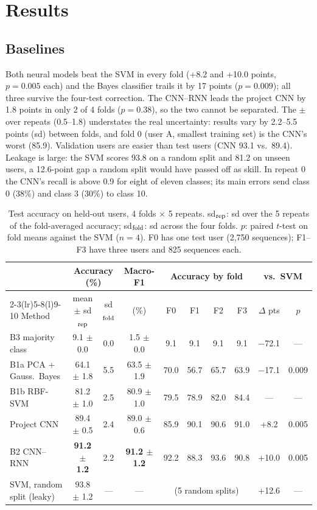 \documentclass[11pt]{article}
\begin{document}
\section{Results}\label{sec:res}
\subsection{Baselines}
Both neural models beat the SVM in every fold (+8.2 and +10.0 points, $p=0.005$ each) and the Bayes classifier trails it by 17 points ($p=0.009$); all three survive the four-test correction. The CNN--RNN leads the project CNN by 1.8 points in only 2 of 4 folds ($p=0.38$), so the two cannot be separated. The $\pm$ over repeats (0.5--1.8) understates the real uncertainty: results vary by 2.2--5.5 points (sd) between folds, and fold 0 (user A, smallest training set) is the CNN's worst (85.9). Validation users are easier than test users (CNN 93.1 vs.\ 89.4). Leakage is large: the SVM scores 93.8 on a random split and 81.2 on unseen users, a 12.6-point gap a random split would have passed off as skill. In repeat 0 the CNN's recall is above 0.9 for eight of eleven classes; its main errors send class 0 (38\%) and class 3 (30\%) to class 10.

\begin{table}[!tb]
\centering
\small
\setlength{\tabcolsep}{3.6pt}
\begin{tabular}{@{}lccccccccc@{}}
\toprule
 & \multicolumn{2}{c}{Accuracy (\%)} & Macro-F1 & \multicolumn{4}{c}{Accuracy by fold} & \multicolumn{2}{c}{vs.\ SVM} \\
\cmidrule(lr){2-3}\cmidrule(lr){5-8}\cmidrule(l){9-10}
Method & mean $\pm$ sd$_{\rm rep}$ & sd$_{\rm fold}$ & (\%) & F0 & F1 & F2 & F3 & $\Delta$ pts & $p$ \\
\midrule
B3 majority class & 9.1 $\pm$ 0.0 & 0.0 & 1.5 $\pm$ 0.0 & 9.1 & 9.1 & 9.1 & 9.1 & $-$72.1 & --- \\
B1a PCA + Gauss.\ Bayes & 64.1 $\pm$ 1.8 & 5.5 & 63.5 $\pm$ 1.9 & 70.0 & 56.7 & 65.7 & 63.9 & $-$17.1 & 0.009 \\
B1b RBF-SVM & 81.2 $\pm$ 1.0 & 2.5 & 80.9 $\pm$ 1.0 & 79.5 & 78.9 & 82.0 & 84.4 & --- & --- \\
Project CNN & 89.4 $\pm$ 0.5 & 2.4 & 89.0 $\pm$ 0.6 & 85.9 & 90.1 & 90.6 & 91.0 & +8.2 & 0.005 \\
B2 CNN--RNN & \textbf{91.2 $\pm$ 1.2} & 2.2 & \textbf{91.2 $\pm$ 1.2} & 92.2 & 88.3 & 93.6 & 90.8 & +10.0 & 0.005 \\
\midrule
SVM, random split (leaky) & 93.8 $\pm$ 1.2 & --- & --- & \multicolumn{4}{c}{(5 random splits)} & +12.6 & --- \\
\bottomrule
\end{tabular}
\caption{Test accuracy on held-out users, 4 folds $\times$ 5 repeats. sd$_{\rm rep}$: sd over the 5 repeats of the fold-averaged accuracy; sd$_{\rm fold}$: sd across the four folds. $p$: paired $t$-test on fold means against the SVM ($n=4$). F0 has one test user (2{,}750 sequences); F1--F3 have three users and 825 sequences each.}
\label{tab:main}
\end{table}
\end{document}
